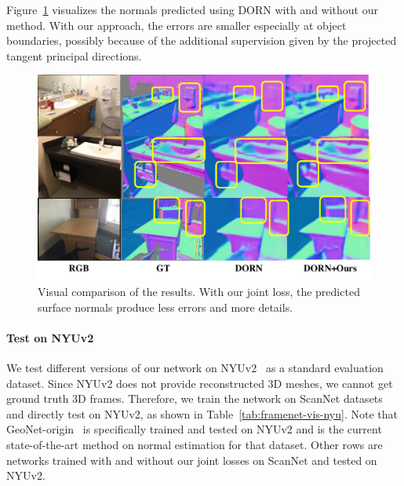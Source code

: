 Figure~\ref{fig:framenet-vis-result} visualizes the normals predicted using DORN with and without our method. With our approach, the errors are smaller especially at object boundaries, possibly because of the additional supervision given by the projected tangent principal directions.
\begin{figure}
    \centering
    \includegraphics[width=0.8\linewidth]{FrameNet/graph/norm-compare.pdf}
    \caption{Visual comparison of the results. With our joint loss, the predicted surface normals produce less errors and more details.}
    \label{fig:framenet-vis-result}
\end{figure}

\paragraph{Test on NYUv2}
\label{sec:framenet-transfer}
We test different versions of our network on NYUv2~\cite{eigen2014depth} as a standard evaluation dataset. Since NYUv2 does not provide reconstructed 3D meshes, we cannot get ground truth 3D frames. Therefore, we train the network on ScanNet datasets and directly test on NYUv2, as shown in Table~\ref{tab:framenet-vis-nyu}. Note that GeoNet-origin~\cite{qi2018geonet} is specifically trained and tested on NYUv2 and is the current state-of-the-art method on normal estimation for that dataset. Other rows are networks trained with and without our joint losses on ScanNet and tested on NYUv2. 


